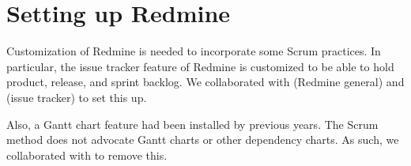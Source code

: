 \section{Setting up Redmine}\label{sec:redmine}

Customization of Redmine is needed to incorporate some Scrum practices. In particular, the issue tracker feature of Redmine is customized to be able to hold product, release, and sprint backlog. We collaborated with  (Redmine general) and  (issue tracker) to set this up. 

Also, a Gantt chart feature had been installed by previous years. The Scrum method does not advocate Gantt charts or other dependency charts. As such, we collaborated with  to remove this.

